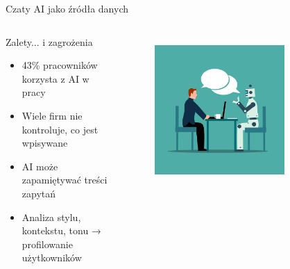 \begin{frame}{Czaty AI jako źródła danych}
\begin{columns}[c]
    \begin{block}{Zalety... i zagrożenia}
        \begin{itemize}
          \item 43\% pracowników korzysta z AI w pracy
          \item Wiele firm nie kontroluje, co jest wpisywane
          \item AI może zapamiętywać treści zapytań
          \item Analiza stylu, kontekstu, tonu → profilowanie użytkowników \cite{ai}
        \end{itemize}
        \end{block}
    \centering
    \begin{figure}
        \centering
        \includegraphics[width=0.75\textwidth]{images/interview.png}
        \label{fig:interview}
    \end{figure}    
\end{columns}
\end{frame}
